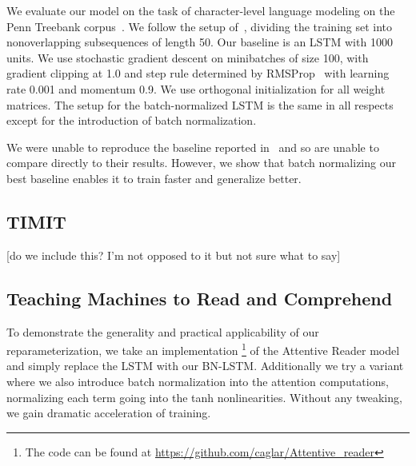 \documentclass{article} %
\begin{document}
We evaluate our model on the task of character-level language modeling on the Penn Treebank corpus~\cite{penntreebank}.
We follow the setup of~\cite{krueger}, dividing the training set into nonoverlapping subsequences of length 50.
Our baseline is an LSTM with 1000 units.
We use stochastic gradient descent on minibatches of size 100,
with gradient clipping at 1.0 and step rule determined by RMSProp~\cite{rmsprop}
with learning rate 0.001 and momentum 0.9.
We use orthogonal initialization for all weight matrices.
The setup for the batch-normalized LSTM is the same in all respects except for the introduction of batch normalization.

We were unable to reproduce the baseline reported in~\cite{krueger} and so are unable to compare directly to their results.
However, we show that batch normalizing our best baseline enables it to train faster and generalize better.

%

\subsection{TIMIT}

[do we include this? I'm not opposed to it but not sure what to say]

\subsection{Teaching Machines to Read and Comprehend}

To demonstrate the generality and practical applicability of our
reparameterization, we take an implementation
\footnote{The code can be found at \url{https://github.com/caglar/Attentive_reader}}
of the Attentive Reader model~\cite{attentivereader} and simply replace the LSTM with our
BN-LSTM.
Additionally we try a variant where we also introduce batch
normalization into the attention computations, normalizing each term
going into the tanh nonlinearities.
Without any tweaking, we gain dramatic acceleration of training.
\end{document}
